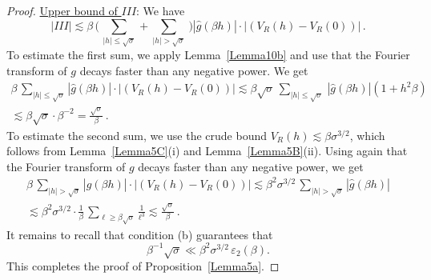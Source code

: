 \documentclass[10pt,a4paper]{amsart}
\def\ep{{\varepsilon}}
\begin{document}
\begin{proof}
\medskip\noindent\underline{Upper bound of $III$}:
We have
\[
| III | \lesssim \beta\, \bigl(\, \sum_{|h|\le\sqrt\sigma} + \sum_{|h|>\sqrt{\sigma}} \,\bigr)
|\widehat{g}(\beta h)|\cdot |(V_R(h) - V_R(0))|\,.
\]
To estimate the first sum, we apply Lemma~\ref{Lemma10b} and use that the Fourier transform of $g$ decays faster than any negative power. We get
\begin{multline*}
\beta\, \sum_{|h|\le\sqrt\sigma}
|\widehat{g}(\beta h)|\cdot |(V_R(h) - V_R(0))| \lesssim \beta\sqrt{\sigma}\,
\sum_{|h|\le\sqrt\sigma}\,  |\widehat{g}(\beta h)| (1+ h^2\beta) \\
\lesssim \beta\sqrt{\sigma} \cdot \beta^{-2} = \frac{\sqrt{\sigma}}\beta\,.
\end{multline*}
To estimate the second sum, we use the crude bound $V_R(h) \lesssim \beta\sigma^{3/2}$,
which follows from Lemma~\ref{Lemma5C}(i) and Lemma~\ref{Lemma5B}(ii).
Using again that the Fourier transform of $g$ decays faster than any negative power, we get
\begin{multline*}
\beta\, \sum_{|h|>\sqrt\sigma}
|\widehat{g}(\beta h)|\cdot |(V_R(h) - V_R(0))| \lesssim \beta^2\sigma^{3/2}\,
\sum_{|h|>\sqrt\sigma} |\widehat{g}(\beta h)| \\
\lesssim \beta^2 \sigma^{3/2} \cdot \frac1{\beta}\,
\sum_{\ell\ge\beta\sqrt\sigma} \frac1{\ell^3} \lesssim \frac{\sqrt{\sigma}}\beta\,.
\end{multline*}
It remains to recall that
condition (b) guarantees that 
$$
\beta^{-1}\sqrt{\sigma} \ll \beta^2 \sigma^{3/2}\, \ep_2(\beta).
$$
This completes the proof of Proposition~\ref{Lemma5a}.
\end{proof}
\end{document}
